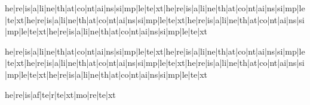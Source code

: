 he|re|is|a|li|ne|th|at|co|nt|ai|ns|si|mp|le|te|xt|he|re|is|a|li|ne|th|at|co|nt|ai|ns|si|mp|le|te|xt|he|re|is|a|li|ne|th|at|co|nt|ai|ns|si|mp|le|te|xt|he|re|is|a|li|ne|th|at|co|nt|ai|ns|si|mp|le|te|xt|he|re|is|a|li|ne|th|at|co|nt|ai|ns|si|mp|le|te|xt %

he|re|is|a|li|ne|th|at|co|nt|ai|ns|si|mp|le|te|xt|he|re|is|a|li|ne|th|at|co|nt|ai|ns|si|mp|le|te|xt|he|re|is|a|li|ne|th|at|co|nt|ai|ns|si|mp|le|te|xt|he|re|is|a|li|ne|th|at|co|nt|ai|ns|si|mp|le|te|xt|he|re|is|a|li|ne|th|at|co|nt|ai|ns|si|mp|le|te|xt%

he|re|is|af|te|r|te|xt|mo|re|te|xt%
